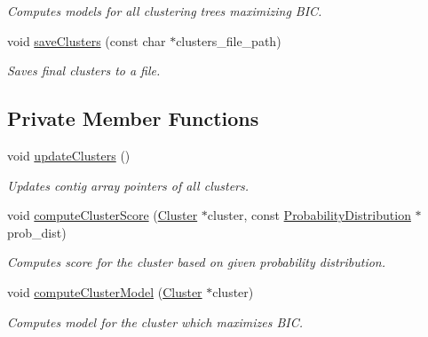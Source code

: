 \begin{DoxyCompactItemize}
\begin{DoxyCompactList}\small\item\em Computes models for all clustering trees maximizing BIC. \item\end{DoxyCompactList}\item 
void \hyperlink{classClusterGraph_aeffbcb6f23718cbf4b8218b1388be882}{saveClusters} (const char $\ast$clusters\_\-file\_\-path)
\begin{DoxyCompactList}\small\item\em Saves final clusters to a file. \item\end{DoxyCompactList}\end{DoxyCompactItemize}
\subsection*{Private Member Functions}
\begin{DoxyCompactItemize}
\item 
void \hyperlink{classClusterGraph_a291b24dc28a367f08115764812805e40}{updateClusters} ()
\begin{DoxyCompactList}\small\item\em Updates contig array pointers of all clusters. \item\end{DoxyCompactList}\item 
void \hyperlink{classClusterGraph_ad32a8fd8ff701eda0abd94f388d16047}{computeClusterScore} (\hyperlink{classCluster}{Cluster} $\ast$cluster, const \hyperlink{classProbabilityDistribution}{ProbabilityDistribution} $\ast$prob\_\-dist)
\begin{DoxyCompactList}\small\item\em Computes score for the cluster based on given probability distribution. \item\end{DoxyCompactList}\item 
void \hyperlink{classClusterGraph_a369ef26fd84e8c9d684ad7641da7e701}{computeClusterModel} (\hyperlink{classCluster}{Cluster} $\ast$cluster)
\begin{DoxyCompactList}\small\item\em Computes model for the cluster which maximizes BIC. \item\end{DoxyCompactList}\end{DoxyCompactItemize}
